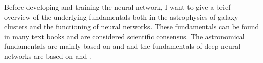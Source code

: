 Before developing and training the neural network, I want to give a brief overview of the underlying fundamentals both in the astrophysics of galaxy clusters and the functioning of neural networks. These fundamentals can be found in many text books and are considered scientific consensus. The astronomical fundamentals are mainly based on \citet{Schneider2006} and \citet{Boehringer2010} and the fundamentals of deep neural networks are based on \citet{Goodfellow-et-al-2016} and \citet{aggarwal2018neural}.